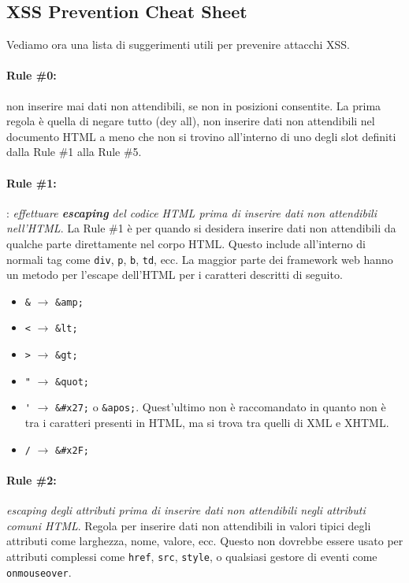 \subsection{XSS Prevention Cheat Sheet}

Vediamo ora una lista di suggerimenti utili per prevenire attacchi XSS.

\paragraph{Rule \#0:} non inserire mai dati non attendibili, se non in posizioni
consentite.
La prima regola è quella di negare tutto (dey all), non inserire dati non
attendibili nel documento HTML a meno che non si trovino all'interno di uno degli
slot definiti dalla Rule \#1 alla Rule \#5.

\paragraph{Rule \#1:} : \textit{effettuare \textbf{escaping} del codice HTML
      prima di inserire dati non attendibili nell'HTML}.
La Rule \#1 è per quando si desidera inserire dati non attendibili da qualche
parte
direttamente nel corpo HTML. Questo include all'interno di normali tag come
\verb|div|, \verb|p|, \verb|b|, \verb|td|,
ecc. La maggior parte dei framework web hanno un metodo per l'escape dell'HTML
per i caratteri descritti di seguito.

\begin{itemize}
      \item \verb|&| $\rightarrow$ \verb|&amp;|
      \item \verb|<| $\rightarrow$ \verb|&lt;|
      \item \verb|>| $\rightarrow$ \verb|&gt;|
      \item \verb|"| $\rightarrow$ \verb|&quot;|
      \item \verb|'| $\rightarrow$ \verb|&#x27;| o \verb|&apos;|. Quest'ultimo
            non è raccomandato in quanto non è tra i caratteri presenti in HTML, ma si trova
            tra quelli di XML e XHTML.
      \item \verb|/| $\rightarrow$ \verb|&#x2F;|
\end{itemize}

\paragraph{Rule \#2:} \textit{escaping degli attributi prima di inserire dati non
      attendibili negli attributi comuni HTML}.
Regola per inserire dati non attendibili in valori tipici degli attributi come
larghezza, nome,
valore, ecc. Questo non dovrebbe essere usato per attributi complessi come
\verb|href|, \verb|src|, \verb|style|,
o qualsiasi gestore di eventi come \verb|onmouseover|.

